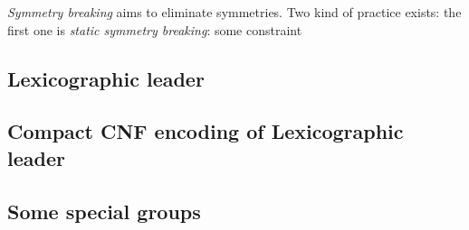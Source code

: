 \emph{Symmetry breaking} aims to eliminate symmetries. Two kind of practice exists: the first one is 
\emph{static symmetry breaking}: some constraint

\subsection{Lexicographic leader}
\subsection{Compact CNF encoding of Lexicographic leader}

\subsection{Some special groups}




